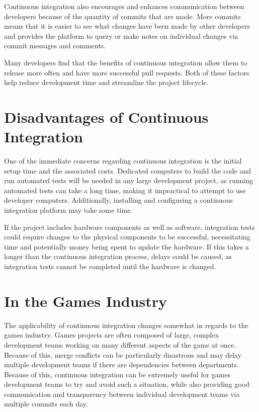 \documentclass{scrartcl}
\begin{document}
Continuous integration also encourages and enhances communication between developers because of the quantity of commits that are made. More commits means that it is easier to see what changes have been made by other developers and provides the platform to query or make notes on individual changes via commit messages and comments.

Many developers find that the benefits of continuous integration allow them to release more often and have more successful pull requests. Both of these factors help reduce development time and streamline the project lifecycle. \cite{hilton2016usage}


\section{Disadvantages of Continuous Integration}

One of the immediate concerns regarding continuous integration is the initial setup time and the associated costs. \cite{amrit2017effectiveness} Dedicated computers to build the code and run automated tests will be needed in any large development project, as running automated tests can take a long time, making it impractical to attempt to use developer computers. Additionally, installing and configuring a continuous integration platform may take some time. 

If the project includes hardware components as well as software, integration tests could require changes to the physical components to be successful, necessitating time and potentially money being spent to update the hardware. If this takes a longer than the continuous integration process, delays could be caused, as integration tests cannot be completed until the hardware is changed. \cite{kasauli2017requirements}


\section{In the Games Industry}

The applicability of continuous integration changes somewhat in regards to the games industry. Games projects are often composed of large, complex development teams working on many different aspects of the game at once. Because of this, merge conflicts can be particularly disastrous and may delay multiple development teams if there are dependencies between departments. Because of this, continuous integration can be extremely useful for games development teams to try and avoid such a situation, while also providing good communication and transparency between individual development teams via multiple commits each day. 
\end{document}
